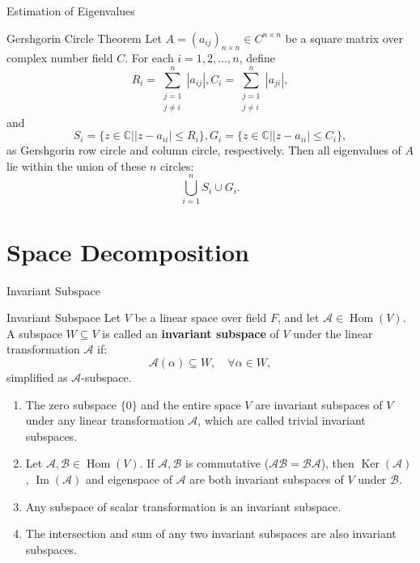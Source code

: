 \documentclass[11pt]{../../TexTemplate/elegantbook} %
\begin{document}
\begin{leftbarTitle}{Estimation of Eigenvalues}\end{leftbarTitle}
\begin{theorem}{Gershgorin Circle Theorem}
    Let \( A = (a_{ij})_{n \times n} \in C^{n \times n} \) be a square matrix over complex number field \( C \).
    For each \( i = 1, 2, \dots, n \), define
    \[
    R_i = \sum_{\substack{j=1 \\ j \neq i}}^{n} |a_{ij}|,
    C_i = \sum_{\substack{j=1 \\ j \neq i}}^{n} |a_{ji}|,
    \]
    and
    \[
    S_{i} = \{ z \in \mathbb{C} | |z - a_{ii}| \leqslant R_i \},
    G_{i} = \{ z \in \mathbb{C} | |z - a_{ii}| \leqslant C_i \},
    \]
    as Gershgorin row circle and column circle, respectively.
    Then all eigenvalues of \( A \) lie within the union of these \( n \) circles:
    \[
    \bigcup_{i=1}^{n} S_{i} \cup G_{i}.
    \]
\end{theorem}


\section{Space Decomposition}

\begin{leftbarTitle}{Invariant Subspace}\end{leftbarTitle}
\begin{definition}{Invariant Subspace}
    Let \( V \) be a linear space over field \( F \), 
    and let \( \mathcal{A}\in \operatorname{Hom}(V) \).
    A subspace \( W \subseteq V \) is called an \textbf{invariant subspace} of \( V \)
    under the linear transformation \( \mathcal{A} \) if:
    \[
    \mathcal{A}(\alpha) \subseteq W, \quad \forall \alpha \in W,
    \]
    simplified as \( \mathcal{A} \)-subspace.
\end{definition}

\begin{property}
    \begin{enumerate}
        \item The zero subspace \( \{0\} \) and the entire space \( V \) are invariant subspaces of \( V \) 
            under any linear transformation \( \mathcal{A} \), which are called trivial invariant subspaces. 
        \item Let \( \mathcal{A}, \mathcal{B} \in \operatorname{Hom}(V) \). 
            If \( \mathcal{A}, \mathcal{B} \) is commutative (\( \mathcal{AB} = \mathcal{BA} \)), 
            then \( \operatorname{Ker}(\mathcal{A}) \), \( \operatorname{Im}(\mathcal{A}) \) and 
            eigenspace of \( \mathcal{A} \) are both invariant subspaces of \( V \) under \( \mathcal{B} \).
        \item Any subspace of scalar transformation is an invariant subspace.
        \item The intersection and sum of any two invariant subspaces are also invariant subspaces.
    \end{enumerate}
\end{property}
\end{document}
